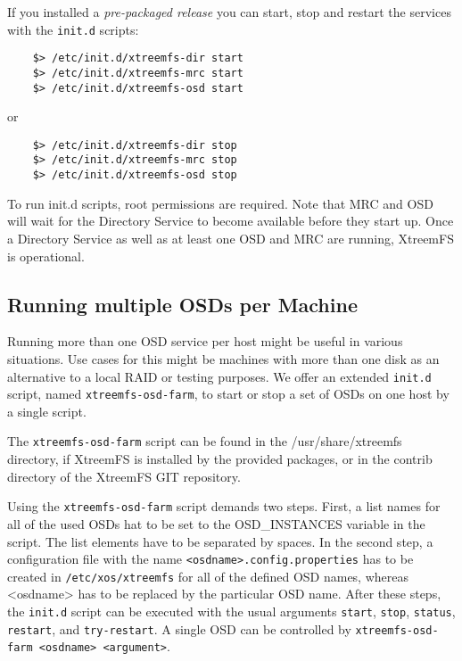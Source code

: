 \documentclass[a4paper,10pt]{book}
\begin{document}
If you installed a \emph{pre-packaged release} you can start, stop and restart the services with the \texttt{init.d} scripts:
	\begin{verbatim}
	$> /etc/init.d/xtreemfs-dir start
	$> /etc/init.d/xtreemfs-mrc start
	$> /etc/init.d/xtreemfs-osd start
	\end{verbatim}
or
	\begin{verbatim}
	$> /etc/init.d/xtreemfs-dir stop
	$> /etc/init.d/xtreemfs-mrc stop
	$> /etc/init.d/xtreemfs-osd stop
	\end{verbatim}


To run init.d scripts, root permissions are required. Note that MRC and OSD will wait for the Directory Service to become available before they start up. Once a Directory Service as well as at least one OSD and MRC are running, XtreemFS is operational.

%
%

\subsection{Running multiple OSDs per Machine}
\label{sec:xtreemfs-osd-farm}

Running more than one OSD service per host might be useful in various situations. Use cases for this might be machines with more than one disk as an alternative to a local RAID or testing purposes. We offer an extended \texttt{init.d} script, named \texttt{xtreemfs-osd-farm}, to start or stop a set of OSDs on one host by a single script.

The \texttt{xtreemfs-osd-farm} script can be found in the /usr/share/xtreemfs directory, if XtreemFS is installed by the provided packages, or in the contrib directory of the XtreemFS GIT repository.

Using the \texttt{xtreemfs-osd-farm} script demands two steps. First, a list names for all of the used OSDs hat to be set to the OSD\_INSTANCES variable in the script. The list elements have to be separated by spaces. In the second step, a configuration file with the name \texttt{<osdname>.config.properties} has to be created in \texttt{/etc/xos/xtreemfs} for all of the defined OSD names, whereas <osdname> has to be replaced by the particular OSD name. After these steps, the \texttt{init.d} script can be executed with the usual arguments \texttt{start}, \texttt{stop}, \texttt{status}, \texttt{restart}, and \texttt{try-restart}. A single OSD can be controlled by \texttt{xtreemfs-osd-farm <osdname> <argument>}.
\end{document}
